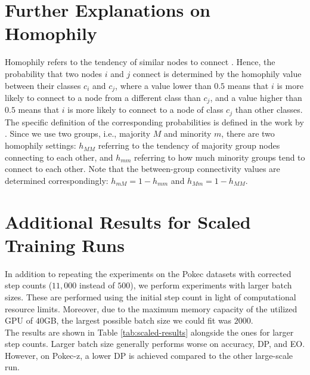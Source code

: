 \section{Further Explanations on Homophily}\label{appendix:homophily}

Homophily refers to the tendency of similar nodes to connect \citep{mcpherson2001birds}. Hence, the probability that two nodes $i$ and $j$ connect is determined by the homophily value between their classes $c_i$ and $c_j$, where a value lower than $0.5$ means that $i$ is more likely to connect to a node from a different class than $c_j$, and a value higher than $0.5$ means that $i$ is more likely to connect to a node of class $c_j$ than other classes. The specific definition of the corresponding probabilities is defined in the work by \citet{espin2022inequality}.
Since we use two groups, i.e., majority $M$ and minority $m$, there are two homophily settings: $h_{MM}$ referring to the tendency of majority group nodes connecting to each other, and $h_{mm}$ referring to how much minority groups tend to connect to each other. 
Note that the between-group connectivity values are determined correspondingly: $h_{mM} = 1 - h_{mm}$ and $h_{Mm} = 1 - h_{MM}$.

\section{Additional Results for Scaled Training Runs}

In addition to repeating the experiments on the Pokec datasets with corrected step counts ($11,000$ instead of $500$), we perform experiments with larger batch sizes. These are performed using the initial step count in light of computational resource limits. Moreover, due to the maximum memory capacity of the utilized GPU of $40$GB, the largest possible batch size we could fit was $2000$.\\
The results are shown in Table \ref{tab:scaled-results} alongside the ones for larger step counts. Larger batch size generally performs worse on accuracy, DP, and EO. However, on Pokec-z, a lower DP is achieved compared to the other large-scale run.

